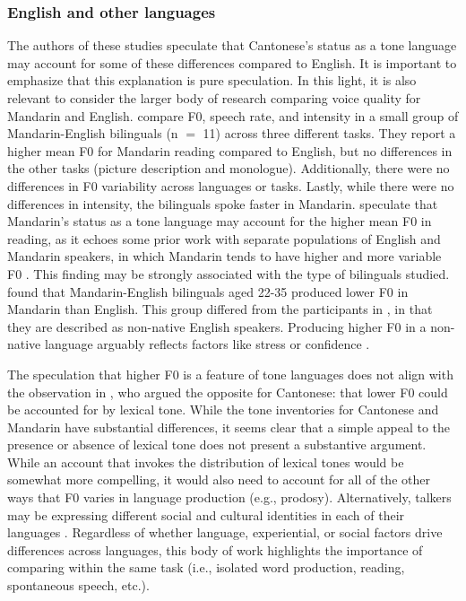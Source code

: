 \subsubsection{English and other languages}

The authors of these studies speculate that Cantonese's status as a tone language may account for some of these differences compared to English. It is important to emphasize that this explanation is pure speculation. In this light, it is also relevant to consider the larger body of research comparing voice quality for Mandarin and English. \citet{lee_2017_bilingual} compare F0, speech rate, and intensity in a small group of Mandarin-English bilinguals (n $=$ 11) across three different tasks. They report a higher mean F0 for Mandarin reading compared to English, but no differences in the other tasks (picture description and monologue). Additionally, there were no differences in F0 variability across languages or tasks. Lastly, while there were no differences in intensity, the bilinguals spoke faster in Mandarin. \citet{lee_2017_bilingual} speculate that Mandarin's status as a tone language may account for the higher mean F0 in reading, as it echoes some prior work with separate populations of English and Mandarin speakers, in which Mandarin tends to have higher and more variable F0 \citep{keating_2012_f0}. This finding may be strongly associated with the type of bilinguals studied. \citet{xue_2002_f0} found that Mandarin-English bilinguals aged 22-35 produced lower F0 in Mandarin than English. This group differed from the participants in \citet{lee_2017_bilingual}, in that they are described as non-native English speakers. Producing higher F0 in a non-native language arguably reflects factors like stress or confidence \citep{jarvinen_2013_speaking, lee_2017_bilingual}.

The speculation that higher F0 is a feature of tone languages does not align with the observation in \citet{ng_2012_ltas}, who argued the opposite for Cantonese: that lower F0 could be accounted for by lexical tone. While the tone inventories for Cantonese and Mandarin have substantial differences, it seems clear that a simple appeal to the presence or absence of lexical tone does not present a substantive argument. While an account that invokes the distribution of lexical tones would be somewhat more compelling, it would also need to account for all of the other ways that F0 varies in language production (e.g., prodosy). Alternatively, talkers may be expressing different social and cultural identities in each of their languages \citep{loveday_1981_pitch, voigt_2016_between}. Regardless of whether language, experiential, or social factors drive differences across languages, this body of work highlights the importance of comparing within the same task (i.e., isolated word production, reading, spontaneous speech, etc.). 

